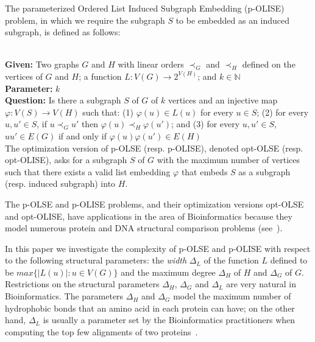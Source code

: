 \documentclass[11pt]{article}
\newcommand{\paramproblem}[4]{\noindent {\sc #1}
\\
{\bf Given:} #2\\
{\bf Parameter:} #3\\
{\bf Question:} #4}
\newcommand{\nat}{\mathbb{N}}
\let\phi=\varphi
\begin{document}
The parameterized {\sc Ordered List Induced Subgraph Embedding} (p-{\sc OLISE}) problem, in which we require the subgraph $S$ to be embedded as an induced subgraph, is defined as follows:

\paramproblem{} {Two graphs $G$ and $H$ with linear orders $\prec_G$ and $\prec_{H}$ defined on the vertices of $G$ and $H$; a function $L : V(G) \longrightarrow 2^{V(H)}$; and $k \in \nat$}{$k$}{Is there a subgraph $S$ of $G$ of $k$ vertices and an injective map $\phi: V(S) \longrightarrow V(H)$ such that: (1) $\phi(u) \in L(u)$ for every $u \in S$; (2) for every $u, u' \in S$, if $u \prec_G u'$ then $\phi(u) \prec_H \phi(u')$; and (3) for every $u, u' \in S$, $uu' \in E(G)$ if and only if $\phi(u)\phi(u') \in E(H)$} \\

The optimization version of p-OLSE (resp. p-OLISE), denoted opt-OLSE (resp. opt-OLISE), asks for a subgraph $S$ of $G$ with the maximum number of vertices such that there exists a valid list embedding $\phi$ that embeds $S$ as a subgraph (resp. induced subgraph) into $H$.

The p-OLSE and p-OLISE problems, and their optimization versions opt-OLSE and opt-OLISE, have applications in the area of Bioinformatics because they model numerous protein and DNA structural comparison problems (see~\cite{xiuzhen,evansphd,evans,xiuzhencai}).

In this paper we investigate the complexity of p-OLSE and p-OLISE with respect to the following structural parameters: the {\em width} $\Delta_L$ of the function $L$ defined to be $max\{|L(u)| : u \in V(G)\}$ and the maximum degree $\Delta_H$ of $H$ and $\Delta_G$ of $G$. Restrictions on the structural parameters $\Delta_H$, $\Delta_G$ and $\Delta_L$ are very natural in Bioinformatics. The parameters $\Delta_H$ and $\Delta_G$ model the maximum number of hydrophobic bonds that an amino acid in each protein can have; on the other hand, $\Delta_L$ is usually a parameter set by the Bioinformatics practitioners when computing the top few alignments of two proteins~\cite{xiuzhencai}.
\end{document}
